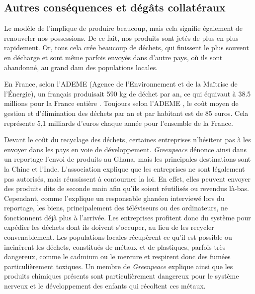 \subsection{Autres conséquences et dégâts collatéraux}


Le modèle de l'\op implique de produire beaucoup, mais cela signifie également de renouveler nos possessions. De ce fait, nos produits sont jetés de plus en plus rapidement. Or, tous cela crée beaucoup de déchets, qui finissent le plus souvent en décharge et sont même parfois envoyés dans d'autre pays, où ils sont abandonné, au grand dam des populations locales.

\bigbreak En France, selon l'ADEME (Agence de l’Environnement et de la Maîtrise de l’Énergie), un français produisait 590 kg de déchet par an, ce qui équivaut à 38.5 millions pour la France entière \cite{ademeStat} . Toujours selon l'ADEME \cite{ADEMEprodDechetFR}, le coût moyen de gestion et d'élimination des déchets par an et par habitant est de 85 euros. Cela représente 5,1 milliards d'euros chaque année pour l'ensemble de la France.

\medbreak Devant le coût du recyclage des déchets, certaines entreprises n’hésitent pas à les envoyer dans les pays en voie de développement. \textit{Greenpeace} dénonce ainsi dans un reportage \cite{GreenPeaceGhana} l'envoi de produits au Ghana, mais les principales destinations sont la Chine et l'Inde. L'association explique que les entreprises ne sont légalement pas autorisés, mais réussissent à contourner la loi. En effet, elles peuvent envoyer des produits dits de seconde main afin qu'ils soient réutilisés ou revendus là-bas. Cependant, comme l'explique un responsable ghanéen interviewé lors du reportage, les biens, principalement des téléviseurs ou des ordinateurs, ne fonctionnent déjà plus à l'arrivée. Les entreprises profitent donc du système pour expédier les déchets dont ils doivent s'occuper, au lieu de les recycler convenablement. Les populations locales récupèrent ce qu'il est possible ou incinèrent les déchets, constitués de métaux et de plastiques, parfois très dangereux, comme le cadmium ou le mercure et respirent donc des fumées particulièrement toxiques. Un membre de \textit{Greenpeace} explique ainsi que les produits chimiques présents sont particulièrement dangereux pour le système nerveux et le développement des enfants qui récoltent ces métaux.

